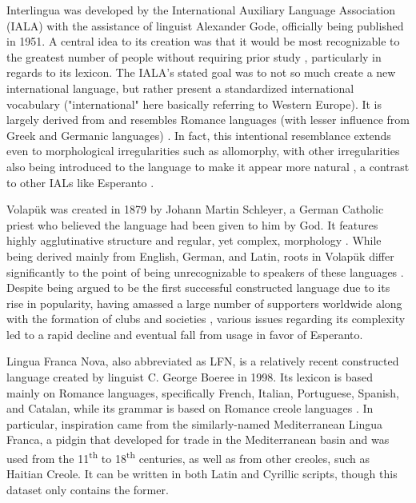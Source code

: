 \documentclass[12pt,a4paper]{article}
\numberwithin{figure}{section}
\numberwithin{table}{section}
\numberwithin{definition}{section}
\begin{document}
Interlingua was developed by the International Auxiliary Language Association (IALA) with the assistance of linguist Alexander Gode, officially being published in 1951. A central idea to its creation was that it would be most recognizable to the greatest number of people without requiring prior study \parencite{goodall2022article}, particularly in regards to its lexicon. The IALA's stated goal was to not so much create a new international language, but rather present a standardized international vocabulary \parencite{Large1985book} ("international" here basically referring to Western Europe). It is largely derived from and resembles Romance languages (with lesser influence from Greek and Germanic languages) \parencite{Schubert2001book}. In fact, this intentional resemblance extends even to morphological irregularities such as allomorphy, with other irregularities also being introduced to the language to make it appear more natural \parencite{goodall2022article,Schubert1993article}, a contrast to other IALs like Esperanto \parencite{Gobbo2016article}.

Volapük was created in 1879 by Johann Martin Schleyer, a German Catholic priest who believed the language had been given to him by God. It features highly agglutinative structure and regular, yet complex, morphology \parencite{Reagan2019book}. While being derived mainly from English, German, and Latin, roots in Volapük differ significantly to the point of being unrecognizable to speakers of these languages \parencite{goodall2022article}. Despite being argued to be the first successful constructed language due to its rise in popularity, having amassed a large number of supporters worldwide along with the formation of clubs and societies \parencite{Gobbo2016article}, various issues regarding its complexity led to a rapid decline and eventual fall from usage in favor of Esperanto.


Lingua Franca Nova, also abbreviated as LFN, is a relatively recent constructed language created by linguist C. George Boeree in 1998. Its lexicon is based mainly on Romance languages, specifically French, Italian, Portuguese, Spanish, and Catalan, while its grammar is based on Romance creole languages \parencite{Pawlas2020inbook}. In particular, inspiration came from the similarly-named Mediterranean Lingua Franca, a pidgin that developed for trade in the Mediterranean basin and was used from the 11\textsuperscript{th} to 18\textsuperscript{th} centuries, as well as from other creoles, such as Haitian Creole. It can be written in both Latin and Cyrillic scripts, though this dataset only contains the former. 
\end{document}
